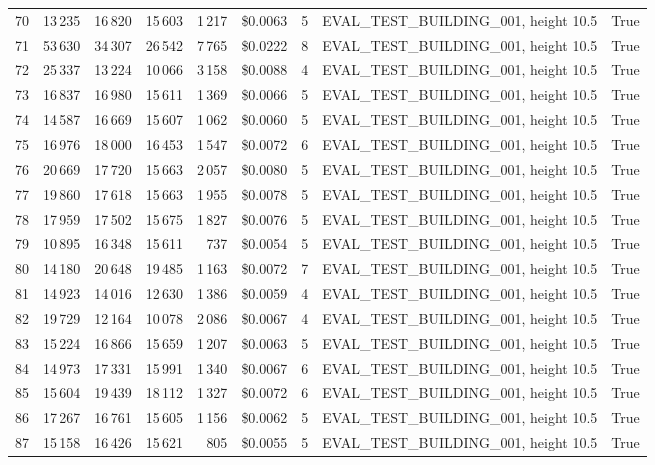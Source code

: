 \documentclass[a4paper,11pt]{article}
\begin{document}
\begin{table}[ht]
\begin{tabular}{r r r r r r r p{3cm} l}
70 & 13\,235 & 16\,820 & 15\,603 & 1\,217 & \$0.0063 & 5 & EVAL\_TEST\_BUILDING\_001, height 10.5 & True \\
71 & 53\,630 & 34\,307 & 26\,542 & 7\,765 & \$0.0222 & 8 & EVAL\_TEST\_BUILDING\_001, height 10.5 & True \\
72 & 25\,337 & 13\,224 & 10\,066 & 3\,158 & \$0.0088 & 4 & EVAL\_TEST\_BUILDING\_001, height 10.5 & True \\
73 & 16\,837 & 16\,980 & 15\,611 & 1\,369 & \$0.0066 & 5 & EVAL\_TEST\_BUILDING\_001, height 10.5 & True \\
74 & 14\,587 & 16\,669 & 15\,607 & 1\,062 & \$0.0060 & 5 & EVAL\_TEST\_BUILDING\_001, height 10.5 & True \\
75 & 16\,976 & 18\,000 & 16\,453 & 1\,547 & \$0.0072 & 6 & EVAL\_TEST\_BUILDING\_001, height 10.5 & True \\
76 & 20\,669 & 17\,720 & 15\,663 & 2\,057 & \$0.0080 & 5 & EVAL\_TEST\_BUILDING\_001, height 10.5 & True \\
77 & 19\,860 & 17\,618 & 15\,663 & 1\,955 & \$0.0078 & 5 & EVAL\_TEST\_BUILDING\_001, height 10.5 & True \\
78 & 17\,959 & 17\,502 & 15\,675 & 1\,827 & \$0.0076 & 5 & EVAL\_TEST\_BUILDING\_001, height 10.5 & True \\
79 & 10\,895 & 16\,348 & 15\,611 & 737 & \$0.0054 & 5 & EVAL\_TEST\_BUILDING\_001, height 10.5 & True \\
80 & 14\,180 & 20\,648 & 19\,485 & 1\,163 & \$0.0072 & 7 & EVAL\_TEST\_BUILDING\_001, height 10.5 & True \\
81 & 14\,923 & 14\,016 & 12\,630 & 1\,386 & \$0.0059 & 4 & EVAL\_TEST\_BUILDING\_001, height 10.5 & True \\
82 & 19\,729 & 12\,164 & 10\,078 & 2\,086 & \$0.0067 & 4 & EVAL\_TEST\_BUILDING\_001, height 10.5 & True \\
83 & 15\,224 & 16\,866 & 15\,659 & 1\,207 & \$0.0063 & 5 & EVAL\_TEST\_BUILDING\_001, height 10.5 & True \\
84 & 14\,973 & 17\,331 & 15\,991 & 1\,340 & \$0.0067 & 6 & EVAL\_TEST\_BUILDING\_001, height 10.5 & True \\
85 & 15\,604 & 19\,439 & 18\,112 & 1\,327 & \$0.0072 & 6 & EVAL\_TEST\_BUILDING\_001, height 10.5 & True \\
86 & 17\,267 & 16\,761 & 15\,605 & 1\,156 & \$0.0062 & 5 & EVAL\_TEST\_BUILDING\_001, height 10.5 & True \\
87 & 15\,158 & 16\,426 & 15\,621 & 805 & \$0.0055 & 5 & EVAL\_TEST\_BUILDING\_001, height 10.5 & True \\

\end{tabular}
\end{table}
\end{document}
